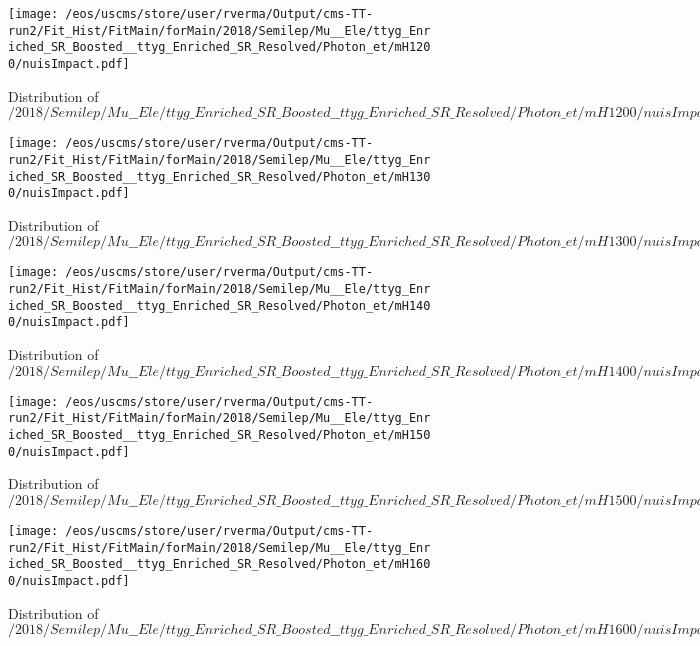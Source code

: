 \begin{figure}
\centering
\texttt{[image: /eos/uscms/store/user/rverma/Output/cms-TT-run2/Fit\_Hist/FitMain/forMain/2018/Semilep/Mu\_\_Ele/ttyg\_Enriched\_SR\_Boosted\_\_ttyg\_Enriched\_SR\_Resolved/Photon\_et/mH1200/nuisImpact.pdf]}
\caption{Distribution of $/2018/Semilep/Mu\_\_Ele/ttyg\_Enriched\_SR\_Boosted\_\_ttyg\_Enriched\_SR\_Resolved/Photon\_et/mH1200/nuisImpact.pdf$}
\end{figure}

\begin{figure}
\centering
\texttt{[image: /eos/uscms/store/user/rverma/Output/cms-TT-run2/Fit\_Hist/FitMain/forMain/2018/Semilep/Mu\_\_Ele/ttyg\_Enriched\_SR\_Boosted\_\_ttyg\_Enriched\_SR\_Resolved/Photon\_et/mH1300/nuisImpact.pdf]}
\caption{Distribution of $/2018/Semilep/Mu\_\_Ele/ttyg\_Enriched\_SR\_Boosted\_\_ttyg\_Enriched\_SR\_Resolved/Photon\_et/mH1300/nuisImpact.pdf$}
\end{figure}

\begin{figure}
\centering
\texttt{[image: /eos/uscms/store/user/rverma/Output/cms-TT-run2/Fit\_Hist/FitMain/forMain/2018/Semilep/Mu\_\_Ele/ttyg\_Enriched\_SR\_Boosted\_\_ttyg\_Enriched\_SR\_Resolved/Photon\_et/mH1400/nuisImpact.pdf]}
\caption{Distribution of $/2018/Semilep/Mu\_\_Ele/ttyg\_Enriched\_SR\_Boosted\_\_ttyg\_Enriched\_SR\_Resolved/Photon\_et/mH1400/nuisImpact.pdf$}
\end{figure}

\begin{figure}
\centering
\texttt{[image: /eos/uscms/store/user/rverma/Output/cms-TT-run2/Fit\_Hist/FitMain/forMain/2018/Semilep/Mu\_\_Ele/ttyg\_Enriched\_SR\_Boosted\_\_ttyg\_Enriched\_SR\_Resolved/Photon\_et/mH1500/nuisImpact.pdf]}
\caption{Distribution of $/2018/Semilep/Mu\_\_Ele/ttyg\_Enriched\_SR\_Boosted\_\_ttyg\_Enriched\_SR\_Resolved/Photon\_et/mH1500/nuisImpact.pdf$}
\end{figure}

\begin{figure}
\centering
\texttt{[image: /eos/uscms/store/user/rverma/Output/cms-TT-run2/Fit\_Hist/FitMain/forMain/2018/Semilep/Mu\_\_Ele/ttyg\_Enriched\_SR\_Boosted\_\_ttyg\_Enriched\_SR\_Resolved/Photon\_et/mH1600/nuisImpact.pdf]}
\caption{Distribution of $/2018/Semilep/Mu\_\_Ele/ttyg\_Enriched\_SR\_Boosted\_\_ttyg\_Enriched\_SR\_Resolved/Photon\_et/mH1600/nuisImpact.pdf$}
\end{figure}

